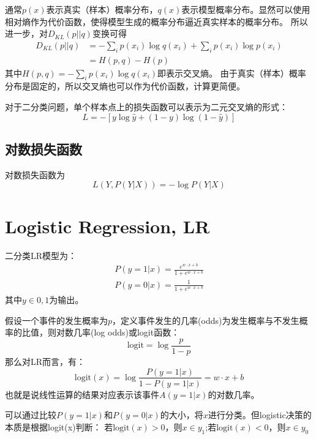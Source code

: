 通常$p(x)$表示真实（样本）概率分布，$q(x)$表示模型概率分布。显然可以使用相对熵作为代价函数，使得模型生成的概率分布逼近真实样本的概率分布。
所以进一步，对$D_{KL}(p||q)$变换可得
\begin{align*}
    D_{KL}(p||q) &= -\sum_i p(x_i) \log q(x_i) + \sum_i p(x_i) \log p(x_i) \\
    &= H(p,q) - H(p)
\end{align*}
其中$H(p,q) = -\sum_i p(x_i) \log q(x_i)$即表示交叉熵。
由于真实（样本）概率分布是固定的，所以交叉熵也可以作为代价函数，计算更简便。

对于二分类问题，单个样本点上的损失函数可以表示为二元交叉熵的形式：
\begin{equation*}
    L = -[y\log \hat{y} + (1-y)\log (1-\hat{y})]
\end{equation*}

\subsection{对数损失函数}
对数损失函数为
\begin{equation*}
    L(Y, P(Y|X)) = -\log P(Y|X)
\end{equation*}



\section{Logistic Regression, LR}
二分类LR模型为：
\begin{gather*}
    P(y=1|x) = \frac{e^{w\cdot x + b}}{1 + e^{w\cdot x + b}}\\
    P(y=0|x) = \frac{1}{1 + e^{w\cdot x + b}}
\end{gather*}
其中$y\in{0,1}$为输出。

假设一个事件的发生概率为$p$，定义事件发生的几率(odds)为发生概率与不发生概率的比值，则对数几率(log odds)或logit函数：
\begin{equation*}
    \text{logit} = \log \frac{p}{1-p}
\end{equation*}
那么对LR而言，有：
\begin{equation*}
    \text{logit}(x) = \log\frac{P(y=1|x)}{1-P({y=1|x})} = w\cdot x + b
\end{equation*}
也就是说线性运算的结果对应表示该事件$A(y=1|x)$的对数几率。

可以通过比较$P(y=1|x)$和$P(y=0|x)$的大小，将$x$进行分类。但logistic决策的本质是根据logit(x)判断：
若$\text{logit}(x) > 0$，则$x\in y_1$;若$\text{logit}(x) < 0$，则$x\in y_0$

